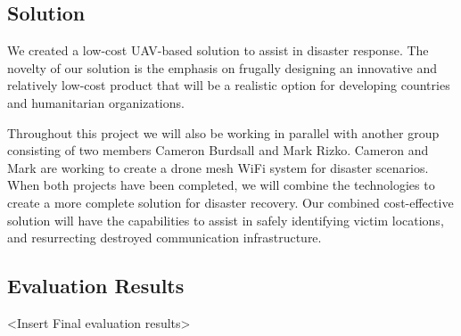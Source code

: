 \subsection{Solution}
We created a low-cost UAV-based solution to assist in disaster response. The novelty of our solution is the emphasis on frugally designing an innovative and relatively low-cost product that will be a realistic option for developing countries and humanitarian organizations. 

Throughout this project we will also be working in parallel with another group consisting of two members Cameron Burdsall and Mark Rizko. Cameron and Mark are working to create a drone mesh WiFi system for disaster scenarios. When both projects have been completed, we will combine the technologies to create a more complete solution for disaster recovery. Our combined cost-effective solution will have the capabilities to assist in safely identifying victim locations, and resurrecting destroyed communication infrastructure.

\subsection{Evaluation Results}
    <Insert Final evaluation results>


